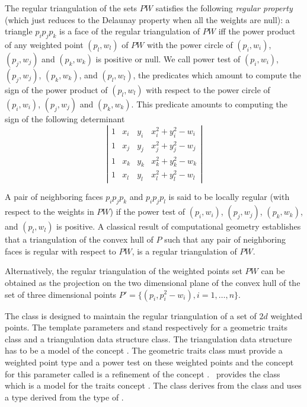 The regular triangulation of the sets ${  PW}$
satisfies the following {\em regular property} (which just reduces to the 
Delaunay property when all the weights are null):
a triangle $p_ip_jp_k$ is a face of the regular triangulation
of ${  PW}$ iff the power product of any weighted point
 $(p_l, w_l)$ of ${  PW}$ with the power circle of
 $(p_i, w_i)$, $(p_j, w_j)$ and $(p_k, w_k)$ is positive or null.
We call  power test of  $(p_i, w_i)$, $(p_j, w_j)$, $(p_k, w_k)$,
and $(p_l, w_l)$,  the predicates which amount to compute
the sign of 
the power product of $(p_l, w_l)$ with respect to
the power circle of
 $(p_i, w_i)$, $(p_j, w_j)$ and $(p_k, w_k)$.
This predicate amounts to computing the sign of
the following
determinant
\[\left| \begin{array}{cccc}
1  &  x_i  &  y_i  &  x_i ^2 + y_i ^2 - w_i  \\
1  &  x_j  &  y_j  &  x_j ^2 + y_j ^2 - w_j  \\
1  &  x_k  &  y_k  &  x_k ^2 + y_k ^2 - w_k  \\
1  &  x_l  &  y_l  &  x_l ^2 + y_l ^2 - w_l
\end{array}
\right|
\]

A pair of neighboring faces $p_ip_jp_k$
and $p_ip_jp_l$ is said to be locally regular
(with respect to  the weights in ${  PW}$)
if the power test of $(p_i, w_i)$, $(p_j, w_j)$, $(p_k, w_k)$,
and $(p_l, w_l)$ is positive.
A classical  result of computational geometry
establishes that a triangulation of the convex hull of ${  P}$
such that any pair of neighboring faces is regular with respect
to ${  PW}$, is a
 regular triangulation of ${  PW}$.

Alternatively, the regular triangulation
of the weighted points set ${  PW}$
can be obtained as the projection
on the two dimensional plane of the convex hull of the set of three
dimensional points 
${  P'}= \{ (p_i,p_i ^2 - w_i ), i = 1, \ldots , n \}$.

The class 
 is designed to maintain the
regular triangulation of a set of $2d$ weighted points.
The template parameters   and  stand respectively
 for a geometric traits class and a triangulation data structure class.
The triangulation data structure has to be a model of the concept
.
The geometric traits class must provide a weighted point type
and a power test on these weighted points
and the concept for this parameter called
is a refinement of the concept
. \cgal\ provides 
the class
which is a model for the traits concept
.
The class 
derives  from the class
and uses a  type
derived from the type  of
.


